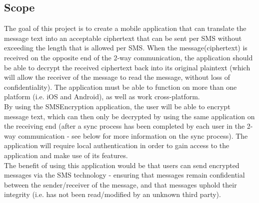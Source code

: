 \subsection{Scope}
The goal of this project is to create a mobile application that can translate the message text into an acceptable ciphertext that can be sent per SMS without exceeding the length that is allowed per SMS. When the message(ciphertext) is received on the opposite end of the 2-way communication, the application should be able to decrypt the received ciphertext back into its original plaintext (which will allow the receiver of the message to read the message, without loss of confidentiality). The application must be able to function on more than one platform (i.e. iOS and Android), as well as work cross-platform.
\vspace{10pt}\\
By using the SMSEncryption application, the user will be able to encrypt message text, which can then only be decrypted by using the same application on the receiving end (after a sync process has been completed by each user in the 2-way communication - see below for more information on the sync process). The application will require local authentication in order to gain access to the application and make use of its features.
\vspace{10pt}\\
The benefit of using this application would be that users can send encrypted messages via the SMS technology - ensuring that messages remain confidential between the sender/receiver of the message, and that messages uphold their integrity (i.e. has not been read/modified by an unknown third party).

